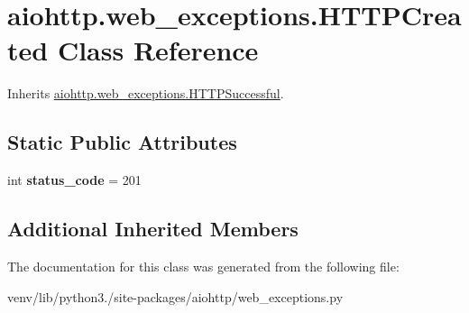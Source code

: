 \hypertarget{classaiohttp_1_1web__exceptions_1_1_h_t_t_p_created}{}\section{aiohttp.\+web\+\_\+exceptions.\+H\+T\+T\+P\+Created Class Reference}
\label{classaiohttp_1_1web__exceptions_1_1_h_t_t_p_created}


Inherits \hyperlink{classaiohttp_1_1web__exceptions_1_1_h_t_t_p_successful}{aiohttp.\+web\+\_\+exceptions.\+H\+T\+T\+P\+Successful}.

\subsection*{Static Public Attributes}
\begin{DoxyCompactItemize}
\item 
\mbox{\label{classaiohttp_1_1web__exceptions_1_1_h_t_t_p_created_a3c54303780dbe49a1614d5800388fe26}} 
int {\bfseries status\+\_\+code} = 201
\end{DoxyCompactItemize}
\subsection*{Additional Inherited Members}


The documentation for this class was generated from the following file\+:\begin{DoxyCompactItemize}
\item 
venv/lib/python3./site-\/packages/aiohttp/web\+\_\+exceptions.\+py\end{DoxyCompactItemize}
